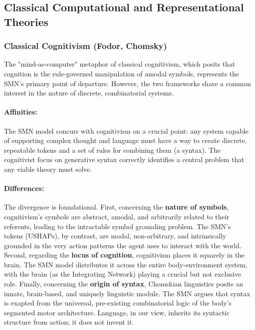 \subsection{Classical Computational and Representational Theories}
\label{subsec:comparison_classical}

\subsubsection{Classical Cognitivism (Fodor, Chomsky)}
\label{ssubsec:cognitivism}
The "mind-as-computer" metaphor of classical cognitivism, which posits that cognition is the rule-governed manipulation of amodal symbols, represents the SMN's primary point of departure. However, the two frameworks share a common interest in the nature of discrete, combinatorial systems.

\paragraph{Affinities:} The SMN model concurs with cognitivism on a crucial point: any system capable of supporting complex thought and language must have a way to create discrete, repeatable tokens and a set of rules for combining them (a syntax). The cognitivist focus on generative syntax correctly identifies a central problem that any viable theory must solve.

\paragraph{Differences:} The divergence is foundational. First, concerning the \textbf{nature of symbols}, cognitivism's symbols are abstract, amodal, and arbitrarily related to their referents, leading to the intractable symbol grounding problem. The SMN's tokens (USHAPs), by contrast, are modal, non-arbitrary, and intrinsically grounded in the very action patterns the agent uses to interact with the world. Second, regarding the \textbf{locus of cognition}, cognitivism places it squarely in the brain. The SMN model distributes it across the entire body-environment system, with the brain (as the Integrating Network) playing a crucial but not exclusive role. Finally, concerning the \textbf{origin of syntax}, Chomskian linguistics posits an innate, brain-based, and uniquely linguistic module. The SMN argues that syntax is exapted from the universal, pre-existing combinatorial logic of the body's segmented motor architecture. Language, in our view, inherits its syntactic structure from action; it does not invent it.
